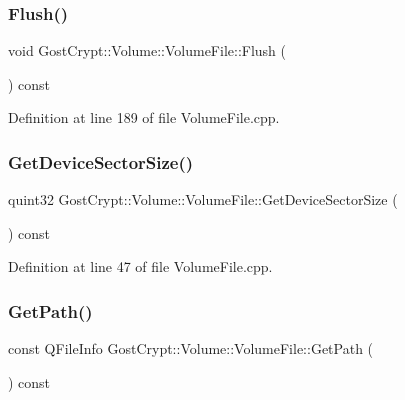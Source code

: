 \subsubsection{\texorpdfstring{Flush()}{Flush()}}
{\footnotesize\ttfamily void Gost\+Crypt\+::\+Volume\+::\+Volume\+File\+::\+Flush (\begin{DoxyParamCaption}{ }\end{DoxyParamCaption}) const}



Definition at line 189 of file Volume\+File.\+cpp.

\mbox{\label{class_gost_crypt_1_1_volume_1_1_volume_file_afbb8b01515352d6833230e38fd3d47e8}} 
\subsubsection{\texorpdfstring{Get\+Device\+Sector\+Size()}{GetDeviceSectorSize()}}
{\footnotesize\ttfamily quint32 Gost\+Crypt\+::\+Volume\+::\+Volume\+File\+::\+Get\+Device\+Sector\+Size (\begin{DoxyParamCaption}{ }\end{DoxyParamCaption}) const}



Definition at line 47 of file Volume\+File.\+cpp.

\mbox{\label{class_gost_crypt_1_1_volume_1_1_volume_file_afa7e6863b060a91e7347a38870e11e5d}} 
\subsubsection{\texorpdfstring{Get\+Path()}{GetPath()}}
{\footnotesize\ttfamily const Q\+File\+Info Gost\+Crypt\+::\+Volume\+::\+Volume\+File\+::\+Get\+Path (\begin{DoxyParamCaption}{ }\end{DoxyParamCaption}) const}



